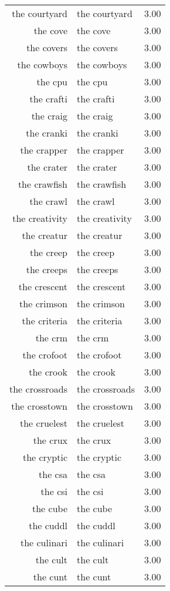 \begin{table}[ht]
\begin{tabular}{rlr}
  the courtyard & the courtyard & 3.00 \\ 
  the cove & the cove & 3.00 \\ 
  the covers & the covers & 3.00 \\ 
  the cowboys & the cowboys & 3.00 \\ 
  the cpu & the cpu & 3.00 \\ 
  the crafti & the crafti & 3.00 \\ 
  the craig & the craig & 3.00 \\ 
  the cranki & the cranki & 3.00 \\ 
  the crapper & the crapper & 3.00 \\ 
  the crater & the crater & 3.00 \\ 
  the crawfish & the crawfish & 3.00 \\ 
  the crawl & the crawl & 3.00 \\ 
  the creativity & the creativity & 3.00 \\ 
  the creatur & the creatur & 3.00 \\ 
  the creep & the creep & 3.00 \\ 
  the creeps & the creeps & 3.00 \\ 
  the crescent & the crescent & 3.00 \\ 
  the crimson & the crimson & 3.00 \\ 
  the criteria & the criteria & 3.00 \\ 
  the crm & the crm & 3.00 \\ 
  the crofoot & the crofoot & 3.00 \\ 
  the crook & the crook & 3.00 \\ 
  the crossroads & the crossroads & 3.00 \\ 
  the crosstown & the crosstown & 3.00 \\ 
  the cruelest & the cruelest & 3.00 \\ 
  the crux & the crux & 3.00 \\ 
  the cryptic & the cryptic & 3.00 \\ 
  the csa & the csa & 3.00 \\ 
  the csi & the csi & 3.00 \\ 
  the cube & the cube & 3.00 \\ 
  the cuddl & the cuddl & 3.00 \\ 
  the culinari & the culinari & 3.00 \\ 
  the cult & the cult & 3.00 \\ 
  the cunt & the cunt & 3.00 \\ 

\end{tabular}
\end{table}
